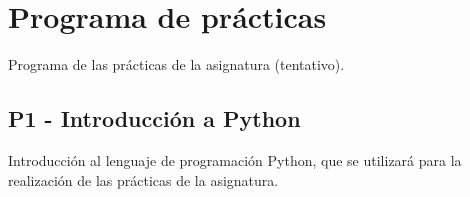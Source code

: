 \documentclass[a4paper,12pt]{article}
\begin{document}
%
%
%
%
%
%
\newpage

\section{Programa de prácticas}

Programa de las prácticas de la asignatura (tentativo).

\subsection{P1 - Introducción a Python}

Introducción al lenguaje de programación Python, que se utilizará para la realización de las prácticas de la asignatura.
\end{document}
